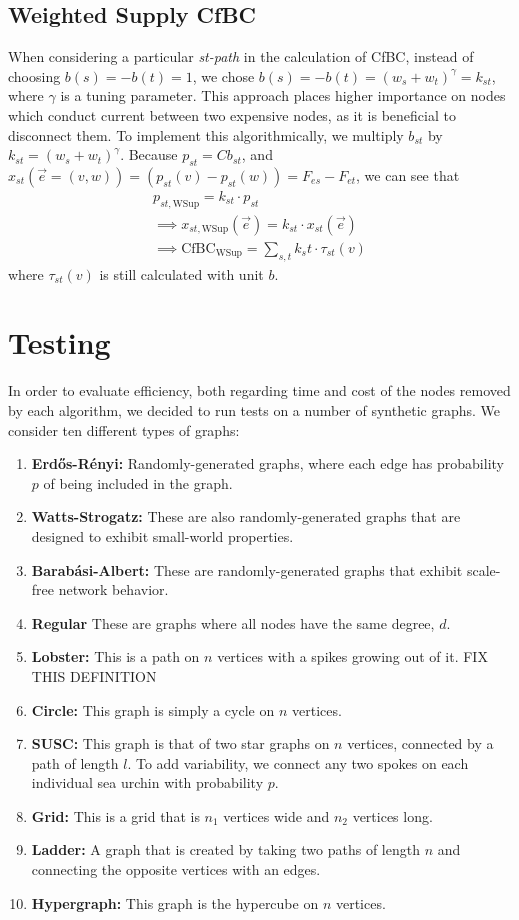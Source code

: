 \documentclass{article}
\begin{document}
\subsection{Weighted Supply CfBC} 
When considering a particular \textit{st-path} in the calculation of CfBC, instead of choosing $b(s) = -b(t) = 1$, we chose $b(s) = -b(t) = (w_s + w_t)^\gamma = k_{st}$, where $\gamma$ is a tuning parameter. This approach places higher importance on nodes which conduct current between two expensive nodes, as it is beneficial to disconnect them. To implement this algorithmically, we multiply $b_{st}$ by $k_{st} = (w_s + w_t)^\gamma$. Because $p_{st} = C b_{st}$, and $x_{st}(\Vec{e}= (v, w)) = (p_{st}(v) - p_{st}(w)) = F_{es} - F_{et}$, we can see that 
\begin{align}
    p_{st, \text{WSup}} = k_{st} \cdot p_{st} \\
    \implies x_{st, \text{WSup}}(\Vec{e}) = k_{st} \cdot x_{st}(\Vec{e}) \\
    \implies \text{CfBC}_{\text{WSup}} = \sum_{s,t} k_st \cdot \tau_{st}(v)
\end{align} where $\tau_{st}(v)$ is still calculated with unit $b$.

\section{Testing}
In order to evaluate efficiency, both regarding time and cost of the nodes removed by each algorithm, we decided to run tests on a number of synthetic graphs.
We consider ten different types of graphs:
\begin{enumerate}
    \item \textbf{Erd\H{o}s-Rényi:} Randomly-generated graphs, where each edge has probability $p$ of being included in the graph. 
    \item \textbf{Watts-Strogatz:} These are also randomly-generated graphs that are designed to exhibit small-world properties. 
    \item \textbf{Barabási-Albert:} These are randomly-generated graphs that exhibit scale-free network behavior.
    \item \textbf{Regular} These are graphs where all nodes have the same degree, $d$.
    \item \textbf{Lobster:} This is a path on $n$ vertices with a spikes growing out of it. FIX THIS DEFINITION
    \item \textbf{Circle:} This graph is simply a cycle on $n$ vertices. 
    \item \textbf{SUSC:} This graph is that of two star graphs on $n$ vertices, connected by a path of length $l$. To add variability, we connect any two spokes on each individual sea urchin with probability $p$.
    \item \textbf{Grid:} This is a grid that is $n_1$ vertices wide and $n_2$ vertices long. 
    \item \textbf{Ladder:} A graph that is created by taking two paths of length $n$ and connecting the opposite vertices with an edges.
    \item \textbf{Hypergraph:} This graph is the hypercube on $n$ vertices.

\end{enumerate}
\end{document}
